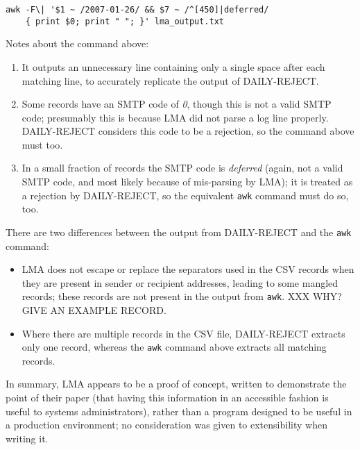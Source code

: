 \begin{verbatim}
awk -F\| '$1 ~ /2007-01-26/ && $7 ~ /^[450]|deferred/
    { print $0; print " "; }' lma_output.txt
\end{verbatim}

Notes about the command above:

\begin{enumerate}

    \item It outputs an unnecessary line containing only a single space
        after each matching line, to accurately replicate the output of
        DAILY-REJECT\@.

    \item Some records have an \gls{SMTP} code of \textit{0}, though this
        is not a valid \gls{SMTP} code; presumably this is because
        \gls{LMA} did not parse a log line properly.  DAILY-REJECT
        considers this code to be a rejection, so the command above must
        too.

    \item In a small fraction of records the \gls{SMTP} code is
        \textit{deferred\/} (again, not a valid \gls{SMTP} code, and most
        likely because of mis-parsing by \gls{LMA}); it is treated as a
        rejection by DAILY-REJECT, so the equivalent \texttt{awk} command
        must do so, too.

\end{enumerate}

There are two differences between the output from DAILY-REJECT and the
\texttt{awk} command:

\begin{itemize}

    \item \gls{LMA} does not escape or replace the separators used in the
        \gls{CSV} records when they are present in sender or recipient
        addresses, leading to some mangled records; these records are not
        present in the output from \texttt{awk}.  XXX WHY\@?  GIVE AN
        EXAMPLE RECORD\@.

    \item Where there are multiple records in the \gls{CSV} file,
        DAILY-REJECT extracts only one record, whereas the \texttt{awk}
        command above extracts all matching records.

\end{itemize}

In summary, \gls{LMA} appears to be a proof of concept, written to
demonstrate the point of their paper (that having this information in an
accessible fashion is useful to systems administrators), rather than a
program designed to be useful in a production environment; no consideration
was given to extensibility when writing it.


